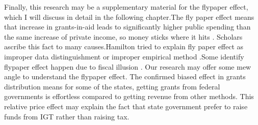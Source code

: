 Finally, this research may be a supplementary material for the flypaper effect, which I will discuss in detail in the following chapter.The fly paper effect means that increase in grants-in-aid leads to significantly higher public spending than the same increase of private income, so money sticks where it hits \cite{inman2008flypaper}. Scholars ascribe this fact to many causes.Hamilton tried to explain fly paper effect as improper data distinguishment or improper empirical method \cite{hamilton1986flypaper}.Some identify flypaper effect happen due to fiscal illusion \cite{gramlich1997stimulative}. Our research may offer some mew angle to understand the flypaper effect. The confirmed biased effect in grants distribution means for some of the states, getting grants from federal governments is effortless compared to getting revenue from other methods. This relative price effect may explain the fact that state government prefer to raise funds from IGT rather than raising tax.

